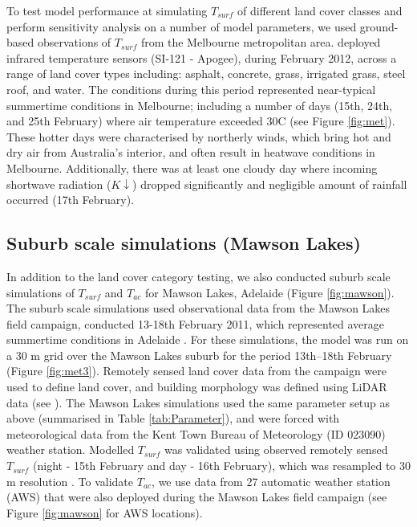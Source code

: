 \documentclass[gmd, manuscript]{copernicus}
\begin{document}
To test model performance at simulating $T_{surf}$ of different land cover classes and perform sensitivity analysis on a number of model parameters, we used ground-based observations of $T_{surf}$ from the Melbourne metropolitan area. \cite{Coutts2016a} deployed infrared temperature sensors (SI-121 - Apogee), during February 2012, across a range of land cover types including: asphalt, concrete, grass, irrigated grass, steel roof, and water. The conditions during this period represented near-typical summertime conditions in Melbourne; including a number of days (15th, 24th, and 25th February) where air temperature exceeded 30\degree C (see Figure \ref{fig:met}). These hotter days were characterised by northerly winds, which bring hot and dry air from Australia's interior, and often result in heatwave conditions in Melbourne. Additionally, there was at least one cloudy day where incoming shortwave radiation (\ensuremath{K\downarrow}) dropped significantly and negligible amount of rainfall occurred (17th February). 




\subsection{Suburb scale simulations (Mawson Lakes)}\label{sec:suburbsim} 
 
In addition to the land cover category testing, we also conducted suburb scale simulations of $T_{surf}$ and $T_{ac}$ for Mawson Lakes, Adelaide (Figure \ref{fig:mawson}). The suburb scale simulations used observational data from the Mawson Lakes field campaign, conducted 13-18th February 2011, which represented average summertime conditions in Adelaide \citep{Broadbent2017}. For these simulations, the model was run on a 30 m grid over the Mawson Lakes suburb for the period 13th--18th February (Figure \ref{fig:met3}).  Remotely sensed land cover data from the campaign were used to define land cover, and building morphology was defined using LiDAR data (see \cite{Broadbent2017}). The Mawson Lakes simulations used the same parameter setup as above (summarised in Table \ref{tab:Parameter}), and were forced with meteorological data from the Kent Town Bureau of Meteorology (ID 023090) weather station. Modelled $T_{surf}$ was validated using observed remotely sensed $T_{surf}$ (night - 15th February and day - 16th February), which was resampled to 30 m resolution \citep{Broadbent2017}. To validate $T_{ac}$, we use data from 27 automatic weather station (AWS) that were also deployed during the Mawson Lakes field campaign (see Figure \ref{fig:mawson} for AWS locations). 
 
\end{document}
